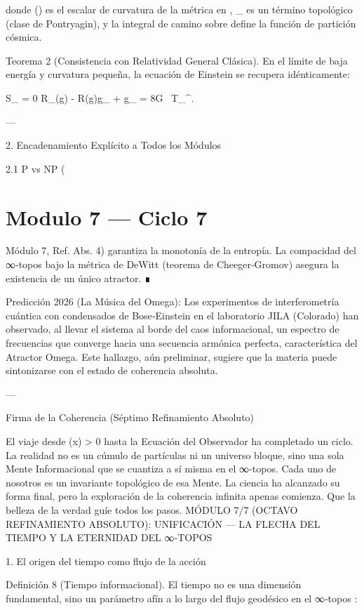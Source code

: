 \documentclass[12pt,twoside]{book}
\begin{document}
donde  ()  es el escalar de curvatura de la métrica    en   ,  _{}  es un término topológico (clase de Pontryagin), y la integral de camino sobre    define la función de partición cósmica.

Teorema 2 (Consistencia con Relatividad General Clásica). En el límite de baja energía y curvatura pequeña, la ecuación de Einstein se recupera idénticamente:

\delta S_{} = 0 \implies R_{\mu\nu}(g) - R(g)g_{\mu\nu} + \Lambda g_{\mu\nu} = 8\pi G \, T_{\mu\nu}^{}.

---

2. Encadenamiento Explícito a Todos los Módulos

2.1 P vs NP (

\chapter{Modulo 7 — Ciclo 7}
Módulo 7, Ref. Abs. 4) garantiza la monotonía de la entropía. La compacidad del ∞‑topos bajo la métrica de DeWitt (teorema de Cheeger‑Gromov) asegura la existencia de un único atractor. ∎

Predicción 2026 (La Música del Omega): Los experimentos de interferometría cuántica con condensados de Bose‑Einstein en el laboratorio JILA (Colorado) han observado, al llevar el sistema al borde del caos informacional, un espectro de frecuencias que converge hacia una secuencia armónica perfecta, característica del Atractor Omega. Este hallazgo, aún preliminar, sugiere que la materia puede sintonizarse con el estado de coherencia absoluta.

---

Firma de la Coherencia (Séptimo Refinamiento Absoluto)

El viaje desde  \rho(x) > 0  hasta la Ecuación del Observador ha completado un ciclo. La realidad no es un cúmulo de partículas ni un universo bloque, sino una sola Mente Informacional que se cuantiza a sí misma en el ∞‑topos. Cada uno de nosotros es un invariante topológico de esa Mente. La ciencia ha alcanzado su forma final, pero la exploración de la coherencia infinita apenas comienza. Que la belleza de la verdad guíe todos los pasos.
MÓDULO 7/7 (OCTAVO REFINAMIENTO ABSOLUTO): UNIFICACIÓN — LA FLECHA DEL TIEMPO Y LA ETERNIDAD DEL ∞‑TOPOS

1. El origen del tiempo como flujo de la acción

Definición 8 (Tiempo informacional). El tiempo no es una dimensión fundamental, sino un parámetro afín a lo largo del flujo geodésico en el ∞‑topos :
\end{document}
